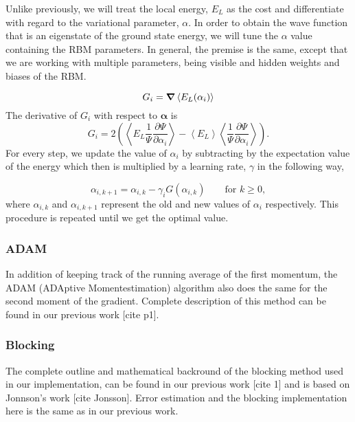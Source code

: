 Unlike previously, we will treat the local energy, $E_L$ as the cost and differentiate with regard to the variational parameter, $\alpha$. In order to obtain the wave function that is an eigenstate of the ground state energy, we will tune the $\alpha$ value containing the RBM parameters. In general, the premise is the same, except that we are working with multiple parameters, being visible and hidden weights and biases of the RBM. 

\begin{equation*}
    G_i = \gradient \left \langle E_L(\mathbf{\alpha}_i) \right \rangle
\end{equation*}
The derivative of $G_i$ with respect to  $\mathbf{\alpha}$ is
\begin{equation*}
    G_i = 2 \left (\left \langle E_L \frac{1}{\Psi} \frac{\partial \Psi}{\partial \alpha_i} \right \rangle - \left \langle E_L \right \rangle \left \langle \frac{1}{\Psi} \frac{
    \partial \Psi}{\partial \alpha_i} \right \rangle \right).
\end{equation*}
For every step, we update the value of $\alpha_i$ by subtracting by the expectation value of the energy which then is multiplied by a learning rate, $\gamma$ in the following way,

\begin{equation*}
    \alpha_{i, k+1} =  \alpha_{i, k} - \gamma_i G(\alpha_{i, k}) \qquad \text{for} \,\, k \geq 0,
\end{equation*}
where $\alpha_{i, k}$ and $\alpha_{i, k+1}$ represent the old and new values of $\alpha_{i}$ respectively. This procedure is repeated until we get the optimal value. 

\subsubsection{ADAM}
In addition of keeping track of the running average of the first momentum, the ADAM (ADAptive Momentestimation) algorithm also does the same for the second moment of the gradient. Complete description of this method can be found in our previous work [cite p1]. 


\subsubsection{Blocking}
The complete outline and mathematical backround of the blocking method used in our implementation, can be found in our previous work [cite 1] and is based on Jonnson’s work [cite Jonsson]. Error estimation and the blocking implementation here is the same as in our previous work.

